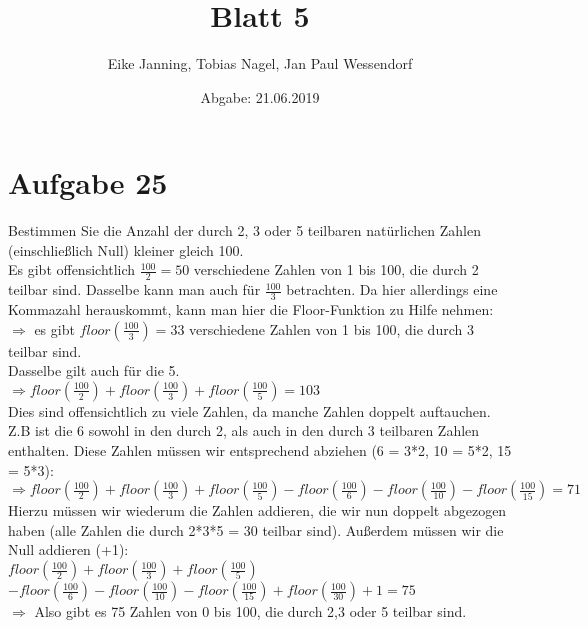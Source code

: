 \documentclass[paper = a4, ngerman]{scrartcl}
\title{Blatt 5}
\author{Eike Janning, Tobias Nagel, Jan Paul Wessendorf}
\date{Abgabe: 21.06.2019}
\begin{document}
	\maketitle
	\hrulefill
	
	\section*{Aufgabe 25}
	
	Bestimmen Sie die Anzahl der durch 2, 3 oder 5 teilbaren natürlichen Zahlen (einschließlich Null) kleiner gleich 100.\\
	
	Es gibt offensichtlich $\frac{100}{2} = 50$ verschiedene Zahlen von 1 bis 100, die durch 2 teilbar sind.
	Dasselbe kann man auch für $\frac{100}{3}$ betrachten. Da hier allerdings eine Kommazahl herauskommt, kann man hier die Floor-Funktion zu Hilfe nehmen: \\
	$\Rightarrow$ es gibt $floor(\frac{100}{3}) = 33$ verschiedene Zahlen von 1 bis 100, die durch 3 teilbar sind.\\
	Dasselbe gilt auch für die 5.\\
	
	$\Rightarrow floor(\frac{100}{2}) + floor(\frac{100}{3}) +  floor(\frac{100}{5}) = 103$\\
	
	Dies sind offensichtlich zu viele Zahlen, da manche Zahlen doppelt auftauchen. Z.B ist die 6 sowohl in den durch 2, als auch in den durch 3 teilbaren Zahlen enthalten. Diese Zahlen müssen wir entsprechend abziehen (6 = 3*2, 10 = 5*2, 15 = 5*3):\\
	
	$\Rightarrow floor(\frac{100}{2}) + floor(\frac{100}{3}) +  floor(\frac{100}{5}) - floor(\frac{100}{6}) - floor(\frac{100}{10}) - floor(\frac{100}{15})= 71$\\
	
	Hierzu müssen wir wiederum die Zahlen addieren, die wir nun doppelt abgezogen haben (alle Zahlen die durch 2*3*5 = 30 teilbar sind). Außerdem müssen wir die Null addieren (+1):\\
	
		$floor(\frac{100}{2}) + floor(\frac{100}{3}) +  floor(\frac{100}{5})$\\$ - floor(\frac{100}{6}) - floor(\frac{100}{10}) - floor(\frac{100}{15}) + floor(\frac{100}{30}) + 1 = 75$\\
	
	$\Rightarrow$ Also gibt es 75 Zahlen von 0 bis 100, die durch 2,3 oder 5 teilbar sind.
\end{document}
